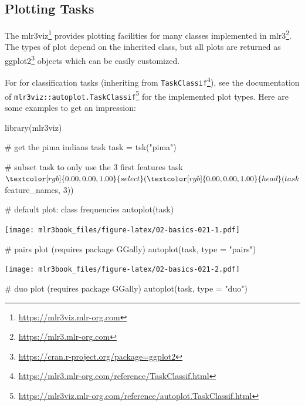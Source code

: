 \documentclass[12pt,]{scrbook}
\newenvironment{Shaded}{}{}
\newcommand{\CommentTok}[1]{\textcolor[rgb]{0.00,0.50,0.00}{#1}}
\newcommand{\DataTypeTok}[1]{#1}
\newcommand{\DecValTok}[1]{#1}
\newcommand{\KeywordTok}[1]{\textcolor[rgb]{0.00,0.00,1.00}{#1}}
\newcommand{\NormalTok}[1]{#1}
\newcommand{\OperatorTok}[1]{#1}
\newcommand{\StringTok}[1]{\textcolor[rgb]{0.00,0.50,0.50}{#1}}
\renewcommand{\href}[2]{#2\footnote{\url{#1}}}
\begin{document}
\hypertarget{autoplot-task}{%
\subsection{Plotting Tasks}\label{autoplot-task}}

The \href{https://mlr3viz.mlr-org.com}{mlr3viz} provides plotting facilities for many classes implemented in \href{https://mlr3.mlr-org.com}{mlr3}.
The types of plot depend on the inherited class, but all plots are returned as \href{https://cran.r-project.org/package=ggplot2}{ggplot2} objects which can be easily customized.

For for classification tasks (inheriting from \href{https://mlr3.mlr-org.com/reference/TaskClassif.html}{\texttt{TaskClassif}}), see the documentation of \href{https://mlr3viz.mlr-org.com/reference/autoplot.TaskClassif.html}{\texttt{mlr3viz::autoplot.TaskClassif}} for the implemented plot types.
Here are some examples to get an impression:

\begin{Shaded}
\begin{Highlighting}[]
\KeywordTok{library}\NormalTok{(mlr3viz)}

\CommentTok{# get the pima indians task}
\NormalTok{task =}\StringTok{ }\KeywordTok{tsk}\NormalTok{(}\StringTok{"pima"}\NormalTok{)}

\CommentTok{# subset task to only use the 3 first features}
\NormalTok{task}\OperatorTok{$}\KeywordTok{select}\NormalTok{(}\KeywordTok{head}\NormalTok{(task}\OperatorTok{$}\NormalTok{feature_names, }\DecValTok{3}\NormalTok{))}

\CommentTok{# default plot: class frequencies}
\KeywordTok{autoplot}\NormalTok{(task)}
\end{Highlighting}
\end{Shaded}

\texttt{[image: mlr3book\_files/figure-latex/02-basics-021-1.pdf]}

\begin{Shaded}
\begin{Highlighting}[]

\CommentTok{# pairs plot (requires package GGally)}
\KeywordTok{autoplot}\NormalTok{(task, }\DataTypeTok{type =} \StringTok{"pairs"}\NormalTok{)}
\end{Highlighting}
\end{Shaded}

\texttt{[image: mlr3book\_files/figure-latex/02-basics-021-2.pdf]}

\begin{Shaded}
\begin{Highlighting}[]

\CommentTok{# duo plot (requires package GGally)}
\KeywordTok{autoplot}\NormalTok{(task, }\DataTypeTok{type =} \StringTok{"duo"}\NormalTok{)}
\end{Highlighting}
\end{Shaded}
\end{document}
